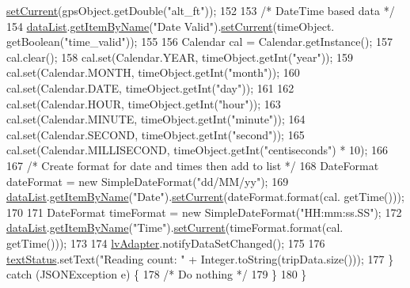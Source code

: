 \begin{DoxyCode}
      \hyperlink{class_android_app_1_1_data_item_a6cd8975067d5be2d5eaac137a94c0eac}{setCurrent}(gpsObject.getDouble(\textcolor{stringliteral}{"alt\_ft"}));
152 
153             \textcolor{comment}{/* DateTime based data */}
154             \hyperlink{class_android_app_1_1_realtime_fragment_ab1c4983b61e50b501ed22842253bf849}{dataList}.\hyperlink{class_android_app_1_1_set_of_data_items_aa559ef3701bb9f59f124ddddc56a2a38}{getItemByName}(\textcolor{stringliteral}{"Date Valid"}).\hyperlink{class_android_app_1_1_data_item_a6cd8975067d5be2d5eaac137a94c0eac}{setCurrent}(timeObject.
      getBoolean(\textcolor{stringliteral}{"time\_valid"}));
155 
156             Calendar cal = Calendar.getInstance();
157             cal.clear();
158             cal.set(Calendar.YEAR, timeObject.getInt(\textcolor{stringliteral}{"year"}));
159             cal.set(Calendar.MONTH, timeObject.getInt(\textcolor{stringliteral}{"month"}));
160             cal.set(Calendar.DATE, timeObject.getInt(\textcolor{stringliteral}{"day"}));
161 
162             cal.set(Calendar.HOUR, timeObject.getInt(\textcolor{stringliteral}{"hour"}));
163             cal.set(Calendar.MINUTE, timeObject.getInt(\textcolor{stringliteral}{"minute"}));
164             cal.set(Calendar.SECOND, timeObject.getInt(\textcolor{stringliteral}{"second"}));
165             cal.set(Calendar.MILLISECOND, timeObject.getInt(\textcolor{stringliteral}{"centiseconds"}) * 10);
166 
167             \textcolor{comment}{/* Create format for date and times then add to list */}
168             DateFormat dateFormat = \textcolor{keyword}{new} SimpleDateFormat(\textcolor{stringliteral}{"dd/MM/yy"});
169             \hyperlink{class_android_app_1_1_realtime_fragment_ab1c4983b61e50b501ed22842253bf849}{dataList}.\hyperlink{class_android_app_1_1_set_of_data_items_aa559ef3701bb9f59f124ddddc56a2a38}{getItemByName}(\textcolor{stringliteral}{"Date"}).\hyperlink{class_android_app_1_1_data_item_a6cd8975067d5be2d5eaac137a94c0eac}{setCurrent}(dateFormat.format(cal.
      getTime()));
170 
171             DateFormat timeFormat = \textcolor{keyword}{new} SimpleDateFormat(\textcolor{stringliteral}{"HH:mm:ss.SS"});
172             \hyperlink{class_android_app_1_1_realtime_fragment_ab1c4983b61e50b501ed22842253bf849}{dataList}.\hyperlink{class_android_app_1_1_set_of_data_items_aa559ef3701bb9f59f124ddddc56a2a38}{getItemByName}(\textcolor{stringliteral}{"Time"}).\hyperlink{class_android_app_1_1_data_item_a6cd8975067d5be2d5eaac137a94c0eac}{setCurrent}(timeFormat.format(cal.
      getTime()));
173 
174             \hyperlink{class_android_app_1_1_realtime_fragment_afeafb95e85d8ba0b9c50aa36af2f4216}{lvAdapter}.notifyDataSetChanged();
175 
176             \hyperlink{class_android_app_1_1_realtime_fragment_a8aa6530bcc9c6ef17627f1395ff7910d}{textStatus}.setText(\textcolor{stringliteral}{"Reading count: "} + Integer.toString(tripData.size()));
177         \} \textcolor{keywordflow}{catch} (JSONException e) \{
178             \textcolor{comment}{/* Do nothing */}
179         \}
180     \}
\end{DoxyCode}


